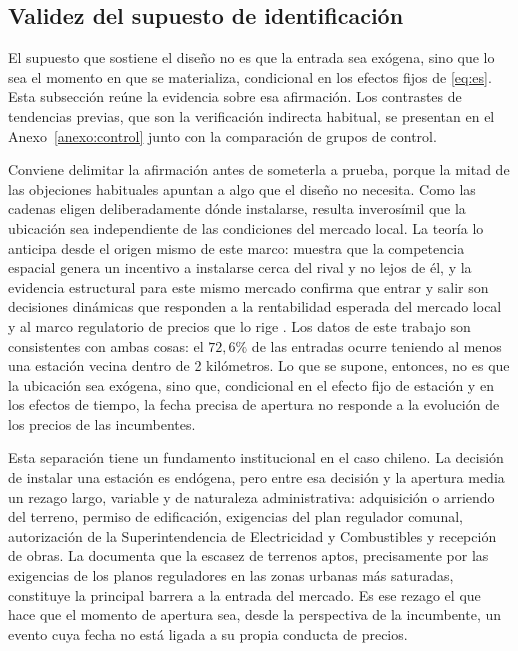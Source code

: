 \subsection{Validez del supuesto de identificación}

El supuesto que sostiene el diseño no es que la entrada sea exógena, sino que lo sea el momento en que se materializa, condicional en los efectos fijos de \eqref{eq:es}. Esta subsección reúne la evidencia sobre esa afirmación. Los contrastes de tendencias previas, que son la verificación indirecta habitual, se presentan en el Anexo~\ref{anexo:control} junto con la comparación de grupos de control.

Conviene delimitar la afirmación antes de someterla a prueba, porque la mitad de las objeciones habituales apuntan a algo que el diseño no necesita. Como las cadenas eligen deliberadamente dónde instalarse, resulta inverosímil que la ubicación sea independiente de las condiciones del mercado local. La teoría lo anticipa desde el origen mismo de este marco: \textcite{HOTELLING1929} muestra que la competencia espacial genera un incentivo a instalarse cerca del rival y no lejos de él, y la evidencia estructural para este mismo mercado confirma que entrar y salir son decisiones dinámicas que responden a la rentabilidad esperada del mercado local y al marco regulatorio de precios que lo rige \parencite{HOUDE2005}. Los datos de este trabajo son consistentes con ambas cosas: el $72{,}6\%$ de las entradas ocurre teniendo al menos una estación vecina dentro de 2 kilómetros. Lo que se supone, entonces, no es que la ubicación sea exógena, sino que, condicional en el efecto fijo de estación y en los efectos de tiempo, la fecha precisa de apertura no responde a la evolución de los precios de las incumbentes.

Esta separación tiene un fundamento institucional en el caso chileno. La decisión de instalar una estación es endógena, pero entre esa decisión y la apertura media un rezago largo, variable y de naturaleza administrativa: adquisición o arriendo del terreno, permiso de edificación, exigencias del plan regulador comunal, autorización de la Superintendencia de Electricidad y Combustibles y recepción de obras. La \textcite{FNE2021informe} documenta que la escasez de terrenos aptos, precisamente por las exigencias de los planos reguladores en las zonas urbanas más saturadas, constituye la principal barrera a la entrada del mercado. Es ese rezago el que hace que el momento de apertura sea, desde la perspectiva de la incumbente, un evento cuya fecha no está ligada a su propia conducta de precios.

